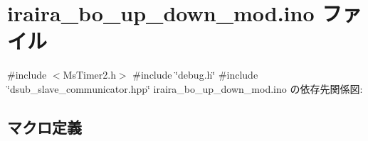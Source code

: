 \hypertarget{iraira__bo__up__down__mod_8ino}{}\section{iraira\+\_\+bo\+\_\+up\+\_\+down\+\_\+mod.\+ino ファイル}
\label{iraira__bo__up__down__mod_8ino}
{\ttfamily \#include $<$Ms\+Timer2.\+h$>$}\newline
{\ttfamily \#include \char`\"{}debug.\+h\char`\"{}}\newline
{\ttfamily \#include \char`\"{}dsub\+\_\+slave\+\_\+communicator.\+hpp\char`\"{}}\newline
iraira\+\_\+bo\+\_\+up\+\_\+down\+\_\+mod.\+ino の依存先関係図\+:
\subsection*{マクロ定義}

